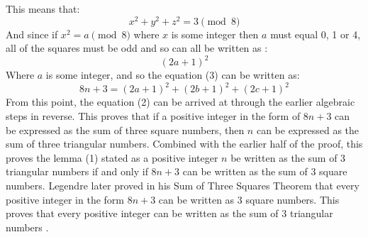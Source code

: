 \documentclass{article}
\begin{document}
This means that:
\[x^2 + y^2 +z^2 = 3 \pmod{8}\]
And since if $x^2=a \pmod{8}$ where $x$ is some integer then $a$ must equal 0, 1 or 4, all of the squares must be odd and so can all be written as \cite{polygonalnumbers}:
\[(2a+1)^2\]
Where $a$ is some integer, and so the equation (3) can be written as:
\[8n+3 = (2a+1)^2 + (2b+1)^2 + (2c+1)^2\]
From this point, the equation (2) can be arrived at through the earlier algebraic steps in reverse. This proves that if a positive integer in the form of $8n+3$ can be expressed as the sum of three square numbers, then $n$ can be expressed as the sum of three triangular numbers. Combined with the earlier half of the proof, this proves the lemma (1) stated as a positive integer $n$ be written as the sum of 3 triangular numbers if and only if $8n+3$ can be written as the sum of 3 square numbers. Legendre later proved in his Sum of Three Squares Theorem that every positive integer in the form $8n+3$ can be written as 3 square numbers. This proves that every positive integer can be written as the sum of 3 triangular numbers \cite{DisAr}.
\end{document}
